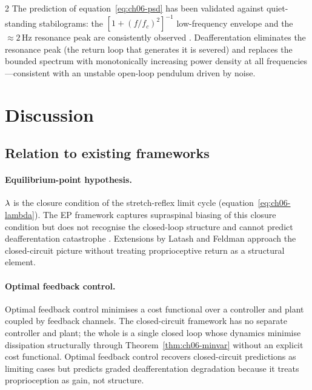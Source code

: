 \begin{multicols}{2}
The prediction of equation~\eqref{eq:ch06-psd} has been validated against
quiet-standing stabilograms: the $[1+(f/f_c)^2]^{-1}$ low-frequency envelope
and the $\approx 2$\,Hz resonance peak are consistently observed
\citep{winter1995,zatsiorsky2000,morasso2002}.  Deafferentation eliminates
the resonance peak (the return loop that generates it is severed) and
replaces the bounded spectrum with monotonically increasing power density
at all frequencies---consistent with an unstable open-loop pendulum driven
by noise.

\section{Discussion}
\label{sec:ch06-discussion}

\subsection{Relation to existing frameworks}

\paragraph{Equilibrium-point hypothesis.}
$\lambda$ is the closure condition of the stretch-reflex limit cycle
(equation~\eqref{eq:ch06-lambda}).  The EP framework captures supraspinal
biasing of this closure condition but does not recognise the closed-loop
structure and cannot predict deafferentation catastrophe
\citep{feldman1986,bizzi1992}.  Extensions by Latash and Feldman
\citep{latash2010,feldman2015} approach the closed-circuit picture without
treating proprioceptive return as a structural element.

\paragraph{Optimal feedback control.}
Optimal feedback control \citep{todorov2002,scott2004} minimises a cost
functional over a controller and plant coupled by feedback channels.  The
closed-circuit framework has no separate controller and plant; the whole is
a single closed loop whose dynamics minimise dissipation structurally through
Theorem~\ref{thm:ch06-minvar} without an explicit cost functional.  Optimal
feedback control recovers closed-circuit predictions as limiting cases but
predicts graded deafferentation degradation because it treats proprioception
as gain, not structure.


\end{multicols}
